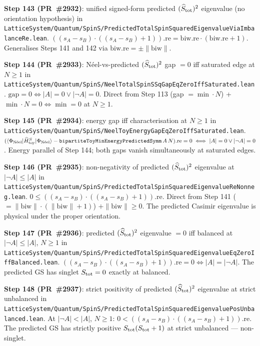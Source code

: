 \documentclass[a4paper,11pt]{article}
\begin{document}
\textbf{Step 143 (PR~\#2932)}: unified signed-form predicted
$(\widehat S_{\rm tot})^2$ eigenvalue (no orientation hypothesis) in
\texttt{LatticeSystem/Quantum/SpinS/PredictedTotalSpinSquaredEigenvalueViaImbalanceRe.lean}.
$((s_A - s_B)\cdot((s_A - s_B) + 1)).\mathrm{re} =
\mathrm{biw.re}\cdot(\mathrm{biw.re} + 1)$.
Generalises Steps 141 and 142 via $\mathrm{biw.re} = \pm\|\mathrm{biw}\|$.

\textbf{Step 144 (PR~\#2933)}: N\'eel-vs-predicted $(\widehat S_{\rm tot})^2$
gap $= 0$ iff saturated edge at $N \ge 1$ in
\texttt{LatticeSystem/Quantum/SpinS/NeelTotalSpinSSqGapEqZeroIffSaturated.lean}.
$\mathrm{gap} = 0 \iff |A| = 0 \vee |\neg A| = 0$.
Direct from Step 113 (gap $= \min\cdot N$) + $\min\cdot N = 0 \iff
\min = 0$ at $N \ge 1$.

\textbf{Step 145 (PR~\#2934)}: energy gap iff characterisation at
$N \ge 1$ in
\texttt{LatticeSystem/Quantum/SpinS/NeelToyEnergyGapEqZeroIffSaturated.lean}.
$(\langle\Phi_{\rm N\acute{e}el}|\widehat H_{\rm toy}^S|\Phi_{\rm N\acute{e}el}\rangle
   - \texttt{bipartiteToyMinEnergyPredictedSymm}\,A\,N).\mathrm{re} = 0
   \iff |A| = 0 \vee |\neg A| = 0$.
Energy parallel of Step 144; both gaps vanish simultaneously at
saturated edges.

\textbf{Step 146 (PR~\#2935)}: non-negativity of predicted
$(\widehat S_{\rm tot})^2$ eigenvalue at $|\neg A| \le |A|$ in
\texttt{LatticeSystem/Quantum/SpinS/PredictedTotalSpinSquaredEigenvalueReNonneg.lean}.
$0 \le ((s_A - s_B)\cdot((s_A - s_B) + 1)).\mathrm{re}$.
Direct from Step 141 ($= \|\mathrm{biw}\|\cdot(\|\mathrm{biw}\|+1)$)
$+ \|\mathrm{biw}\| \ge 0$. The predicted Casimir eigenvalue is
physical under the proper orientation.

\textbf{Step 147 (PR~\#2936)}: predicted $(\widehat S_{\rm tot})^2$
eigenvalue $= 0$ iff balanced at $|\neg A| \le |A|$, $N \ge 1$ in
\texttt{LatticeSystem/Quantum/SpinS/PredictedTotalSpinSquaredEigenvalueEqZeroIffBalanced.lean}.
$((s_A - s_B)\cdot((s_A - s_B) + 1)).\mathrm{re} = 0 \iff |A| = |\neg A|$.
The predicted GS has singlet $S_{\rm tot} = 0$ exactly at balanced.

\textbf{Step 148 (PR~\#2937)}: strict positivity of predicted
$(\widehat S_{\rm tot})^2$ eigenvalue at strict unbalanced in
\texttt{LatticeSystem/Quantum/SpinS/PredictedTotalSpinSquaredEigenvaluePosUnbalanced.lean}.
At $|\neg A| < |A|$, $N \ge 1$:
$0 < ((s_A - s_B)\cdot((s_A - s_B) + 1)).\mathrm{re}$.
The predicted GS has strictly positive $S_{\rm tot}(S_{\rm tot}+1)$
at strict unbalanced --- non-singlet.
\end{document}
